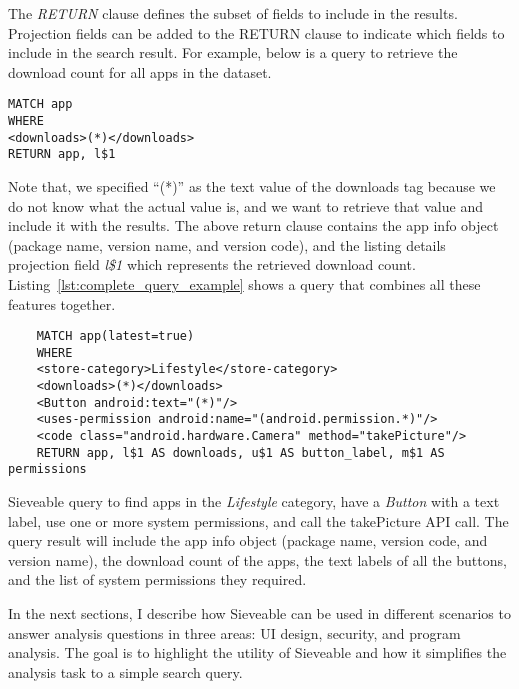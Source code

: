 The \textit{RETURN} clause defines the subset of fields to include in the results.
Projection fields can be added to the RETURN clause to indicate which fields to include in the search result.
For example, below is a query to retrieve the download count for all apps in the dataset.
\begin{verbatim}
MATCH app
WHERE
<downloads>(*)</downloads>
RETURN app, l$1
\end{verbatim}
Note that, we specified ``(*)'' as the text value of the downloads tag because we do not know what the actual value is, and we want to retrieve that value and include it with the results.
The above return clause contains the app info object (package name, version name, and version code), and the listing details projection field \textit{l\$1} which represents the retrieved download count.
Listing~\ref{lst:complete_query_example} shows a query that combines all these features together.
\begin{listing}[ht]
	\begin{verbatim}
	MATCH app(latest=true)
	WHERE
	<store-category>Lifestyle</store-category>
	<downloads>(*)</downloads>
	<Button android:text="(*)"/>
	<uses-permission android:name="(android.permission.*)"/>
	<code class="android.hardware.Camera" method="takePicture"/>
	RETURN app, l$1 AS downloads, u$1 AS button_label, m$1 AS permissions
	\end{verbatim}
	\caption{Sieveable query to find apps in the \textit{Lifestyle} category, have a \textit{Button} with a text label, use one or more system permissions, and call the takePicture API call. The query result will include the app info object (package name, version code, and version name), the download count of the apps, the text labels of all the buttons, and the list of system permissions they required.}
	\label{lst:complete_query_example}
\end{listing}

In the next sections, I describe how Sieveable can be used in different scenarios to answer analysis questions in three areas: UI design, security, and program analysis.
The goal is to highlight the utility of Sieveable and how it simplifies the analysis task to a simple search query. 

